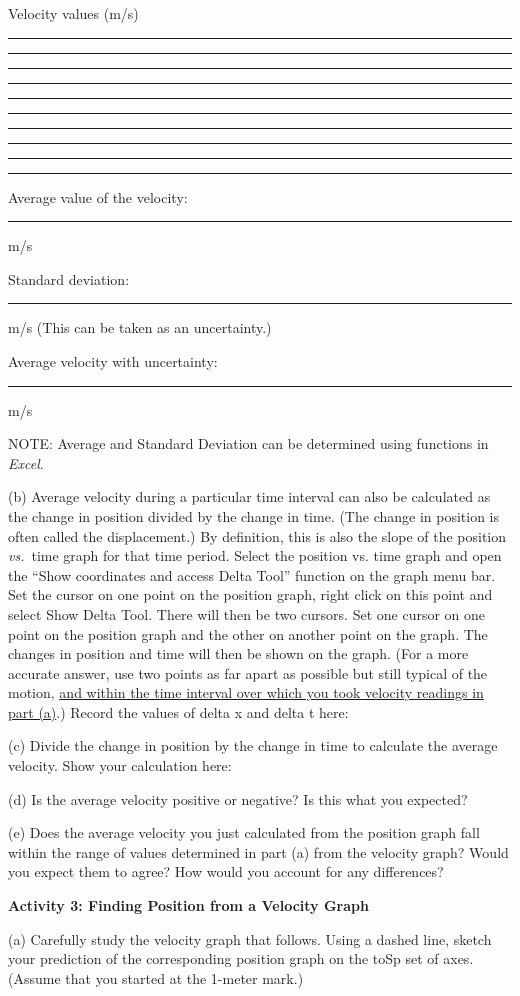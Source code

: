 Velocity values (m/s) \rule{0.5in}{0.1pt} \rule{0.5in}{0.1pt} \rule{0.5in}{0.1pt} \rule{0.5in}{0.1pt} \rule{0.5in}{0.1pt} \rule{0.5in}{0.1pt} \rule{0.5in}{0.1pt} \rule{0.5in}{0.1pt} \rule{0.5in}{0.1pt} \rule{0.5in}{0.1pt}
\answerspace{5mm}

Average value of the velocity: \rule{1.0in}{0.1pt} m/s

Standard deviation: \rule{1.0in}{0.1pt} m/s     (This can be taken as an uncertainty.)

Average velocity with uncertainty: \rule{1.5in}{0.1pt} m/s

NOTE:  Average and Standard Deviation can be determined using functions in \textit{Excel}.

(b) Average velocity during a particular time interval can also be calculated
as the change in position divided by the change in time. (The change in position
is often called the displacement.) By definition, this is also the slope of
the position \textit{vs.}~time graph for that time period. Select the position vs. time graph and open the ``Show coordinates and access Delta Tool'' function on the graph menu bar.  Set the cursor on one point on the position graph, right click on this point and select Show Delta Tool.  There will then be two cursors.  Set one cursor on one point on the position graph and the other on another point on the graph.  The changes in position and time will then be shown on the graph. (For a more accurate answer, use two points as far apart
as possible but still typical of the motion, \underline{and within the time 
interval over which you took velocity readings in part (a)}.) 
Record the values of delta x and delta t here:
\answerspace{10mm}

(c) Divide the change in position by the change in time to calculate the average velocity.  Show your calculation here:
\answerspace{15mm}

(d) Is the average velocity positive or negative? Is this what you expected? 
\answerspace{15mm}

\pagebreak[2]
(e) Does the average velocity you just calculated from the position graph fall within the range of values determined in part (a) from the velocity graph? Would you expect them to agree? How would you account for any differences?
\vspace{20mm}

\textbf{Activity 3: Finding Position from a Velocity Graph }

(a) Carefully study the velocity graph that follows. Using a dashed line, sketch your prediction of the corresponding position graph on the toSp set of axes.
(Assume that you started at the 1-meter mark.)

